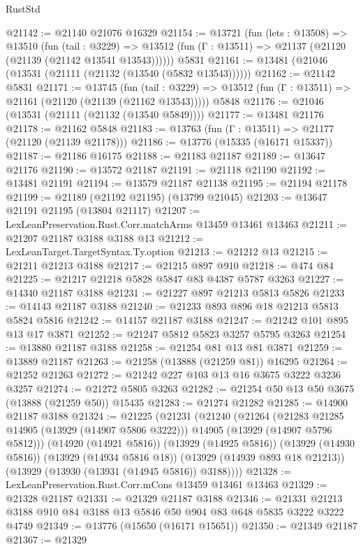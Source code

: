 \begin{lexlean}{RustStd}
\begin{coremodule}
@21142 := @21140 @21076 @16329
@21154 := @13721
    (fun (lets : @13508) =>
    @13510
      (fun (tail : @3229) =>
      @13512 (fun (Γ : @13511) => @21137 (@21120 (@21139 (@21142 @13541 @13543))))))
    @5831
@21161 := @13481 (@21046 (@13531 (@21111 (@21132 (@13540 (@5832 @13543))))))
@21162 := @21142 @5831
@21171 := @13745
    (fun (tail : @3229) => @13512 (fun (Γ : @13511) => @21161 (@21120 (@21139 (@21162 @13543)))))
    @5848
@21176 := @21046 (@13531 (@21111 (@21132 (@13540 @5849))))
@21177 := @13481 @21176
@21178 := @21162 @5848
@21183 := @13763 (fun (Γ : @13511) => @21177 (@21120 (@21139 @21178)))
@21186 := @13776 (@15335 (@16171 @15337))
@21187 := @21186 @16175
@21188 := @21183 @21187
@21189 := @13647 @21176
@21190 := @13572 @21187
@21191 := @21118 @21190
@21192 := @13481 @21191
@21194 := @13579 @21187 @21138
@21195 := @21194 @21178
@21199 := @21189 (@21192 @21195) (@13799 @21045)
@21203 := @13647 @21191 @21195 (@13804 @21117)
@21207 := LexLeanPreservation.Rust.Corr.matchArms @13459 @13461 @13463
@21211 := @21207 @21187 @3188 @3188 @13
@21212 := LexLeanTarget.TargetSyntax.Ty.option
@21213 := @21212 @13
@21215 := @21211 @21213 @3188
@21217 := @21215 @897 @910
@21218 := @474 @84
@21225 := @21217 @21218 @5828 @5847 @83 @4387 @5787 @3263
@21227 := @14340 @21187 @3188
@21231 := @21227 @897 @21213 @5813 @5826
@21233 := @14143 @21187 @3188
@21240 := @21233 @893 @896 @18 @21213 @5813 @5824 @5816
@21242 := @14157 @21187 @3188
@21247 := @21242 @101 @895 @13 @17 @3871
@21252 := @21247 @5812 @5823 @3257 @5795 @3263
@21254 := @13880 @21187 @3188
@21258 := @21254 @81 @13 @81 @3871
@21259 := @13889 @21187
@21263 := @21258 (@13888 (@21259 @81)) @16295
@21264 := @21252 @21263
@21272 := @21242 @227 @103 @13 @16 @3675 @3222 @3236 @3257
@21274 := @21272 @5805 @3263
@21282 := @21254 @50 @13 @50 @3675 (@13888 (@21259 @50)) @15435
@21283 := @21274 @21282
@21285 := @14900 @21187 @3188
@21324 := @21225
    (@21231
      (@21240
        (@21264
          (@21283 @21285 @14905 (@13929 (@14907 @5806 @3222)))
          @14905
          (@13929 (@14907 @5796 @5812)))
        (@14920 (@14921 @5816))
        (@13929 (@14925 @5816))
        (@13929 (@14930 @5816))
        (@13929 (@14934 @5816 @18))
        (@13929 (@14939 @893 @18 @21213))
        (@13929 (@13930 (@13931 (@14945 @5816)) @3188))))
@21328 := LexLeanPreservation.Rust.Corr.mCons @13459 @13461 @13463
@21329 := @21328 @21187
@21331 := @21329 @21187 @3188
@21346 := @21331 @21213 @3188 @910 @84 @3188 @13 @5846 @50 @904 @83 @648 @5835 @3222 @3222 @4749
@21349 := @13776 (@15650 (@16171 @15651))
@21350 := @21349 @21187
@21367 := @21329

\end{coremodule}
\end{lexlean}
